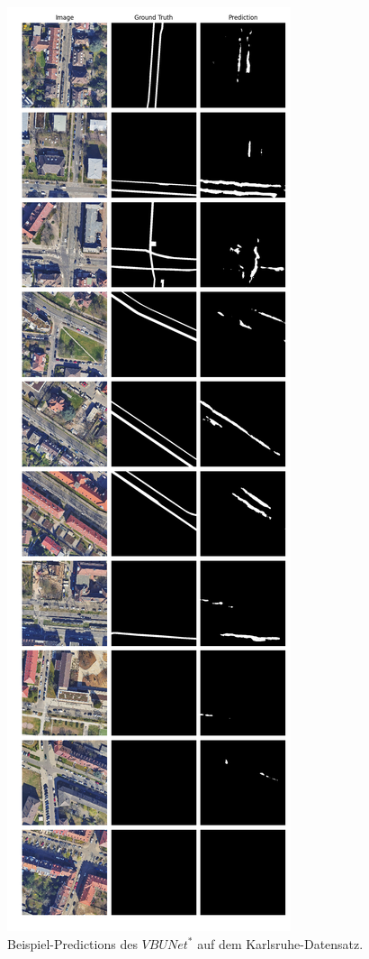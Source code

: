 \begin{figure}
	\centering
	\includegraphics[width=.41\textwidth]{Bilder/Samples-KA/vbunet-s.png} 
	\caption{Beispiel-Predictions des $VBUNet^*$ auf dem Karlsruhe-Datensatz.}
	\label{fig:ka-samples-vbunet-s}
\end{figure}